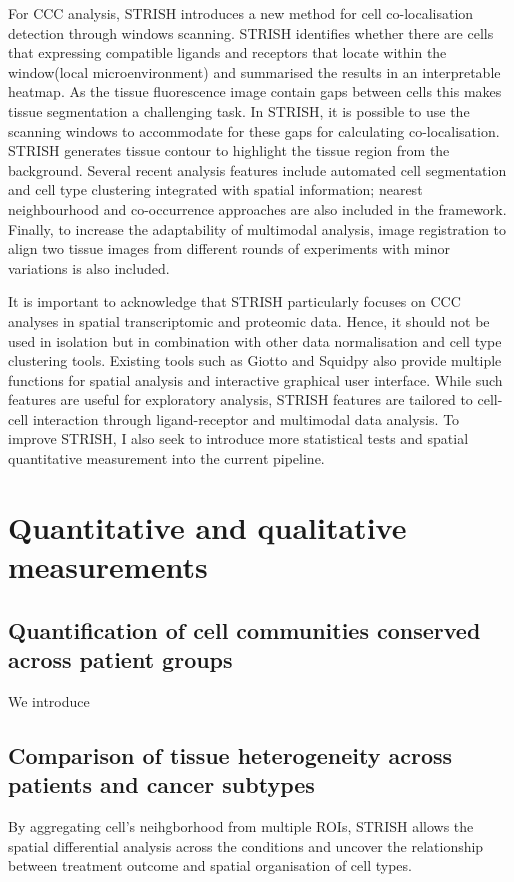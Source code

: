 For CCC analysis, STRISH introduces a new method for cell co-localisation detection through windows scanning. STRISH identifies whether there are cells that expressing compatible ligands and receptors that locate within the window(local microenvironment) and summarised the results in an interpretable heatmap. As the tissue fluorescence image contain gaps between cells this makes tissue segmentation a challenging task. In STRISH, it is possible to use the scanning windows to accommodate for these gaps for calculating co-localisation. STRISH generates tissue contour to highlight the tissue region from the background. Several recent analysis features include automated cell segmentation and cell type clustering integrated with spatial information; nearest neighbourhood and co-occurrence approaches are also included in the framework. Finally, to increase the adaptability of multimodal analysis, image registration to align two tissue images from different rounds of experiments with minor variations is also included.   

It is important to acknowledge that STRISH particularly focuses on CCC analyses in spatial transcriptomic and proteomic data. Hence, it should not be used in isolation but in combination with other data normalisation and cell type clustering tools. Existing tools such as Giotto and Squidpy also provide multiple functions for spatial analysis and interactive graphical user interface. While such features are useful for exploratory analysis, STRISH features are tailored to cell-cell interaction through ligand-receptor and multimodal data analysis. To improve STRISH, I also seek to introduce more statistical tests and spatial quantitative measurement into the current pipeline.

\section{Quantitative and qualitative measurements}
\label{Sec:3.4_validation}	%

\subsection{Quantification of cell communities conserved across patient groups}
We introduce 
\subsection{Comparison of tissue heterogeneity across patients and cancer subtypes}
By aggregating cell's neihgborhood from multiple ROIs, STRISH allows the spatial differential analysis across the  conditions and uncover the relationship between treatment outcome and spatial organisation of cell types.



% 

% 